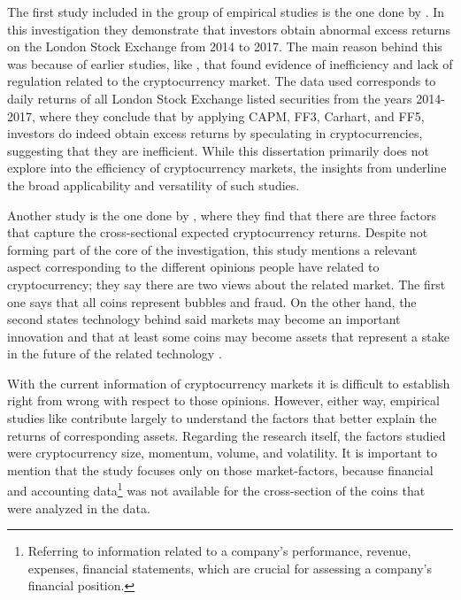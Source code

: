 The first study included in the group of empirical studies is the one done by \parencite{gregoriou2019cryptocurrencies}. In this investigation they demonstrate that investors obtain abnormal excess returns on the London Stock Exchange from 2014 to 2017. The main reason behind this was because of earlier studies, like \parencite{bariviera2017inefficiency}, that found evidence of inefficiency and lack of regulation related to the cryptocurrency market. The data used corresponds to daily returns of all London Stock Exchange listed securities from the years 2014-2017, where they conclude that by applying CAPM, FF3, Carhart, and FF5, investors do indeed obtain excess returns by speculating in cryptocurrencies, suggesting that they are inefficient. While this dissertation primarily does not explore into the efficiency of cryptocurrency markets, the insights from \parencite{gregoriou2019cryptocurrencies} underline the broad applicability and versatility of such studies.

Another study is the one done by \parencite{liu2022common}, where they find that there are three factors that capture the cross-sectional expected cryptocurrency returns. Despite not forming part of the core of the investigation, this study mentions a relevant aspect corresponding to the different opinions people have related to cryptocurrency; they say there are two views about the related market. The first one says that all coins represent bubbles and fraud. On the other hand, the second states technology behind said markets may become an important innovation and that at least some coins may become assets that represent a stake in the future of the related technology \parencite{liu2022common}. 

With the current information of cryptocurrency markets it is difficult to establish right from wrong with respect to those opinions. However, either way, empirical studies like \parencite{liu2022common} contribute largely to understand the factors that better explain the returns of corresponding assets. Regarding the research itself, the factors studied were cryptocurrency size, momentum, volume, and volatility. It is important to mention that the study focuses only on those market-factors, because financial and accounting data\footnote{Referring to information related to a company's performance, revenue, expenses, financial statements, which are crucial for assessing a company's financial position.} was not available for the cross-section of the coins that were analyzed in the data.

